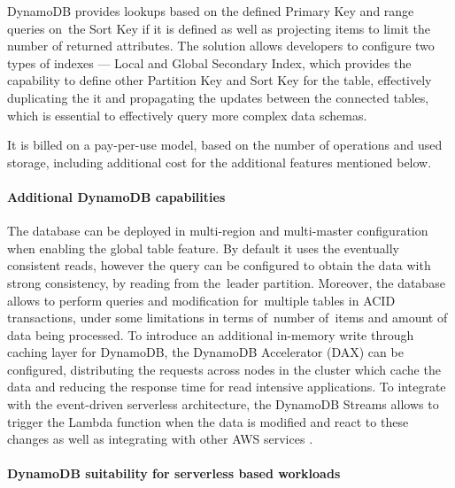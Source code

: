 DynamoDB provides lookups based on the defined Primary Key and range queries on~the Sort Key if it is defined as well as projecting items to limit the number of returned attributes.
The solution allows developers to configure two types of indexes --- Local and Global Secondary Index, which provides the capability to define other Partition Key and Sort Key for the table, effectively duplicating the it and propagating the updates between the connected tables, which is essential to effectively query more complex data schemas.

It is billed on a pay-per-use model, based on the number of operations and used storage, including additional cost for the additional features mentioned below.

\paragraph{Additional DynamoDB capabilities}

The database can be deployed in multi-region and multi-master configuration when enabling the global table feature.
By default it uses the eventually consistent reads, however the query can be configured to obtain the data with strong consistency, by reading from the~leader partition.
Moreover, the database allows to perform queries and modification for~multiple tables in ACID transactions, under some limitations in terms of~number of~items and amount of data being processed.
To introduce an additional in-memory write through caching layer for DynamoDB, the DynamoDB Accelerator (DAX) can be configured, distributing the requests across nodes in the cluster which cache the data and reducing the response time for read intensive applications.
To integrate with the event-driven serverless architecture, the DynamoDB Streams allows to trigger the Lambda function when the data is modified and react to these changes as well as integrating with other AWS services \cite{DynamoDBFeatures}.

\paragraph{DynamoDB suitability for serverless based workloads}

